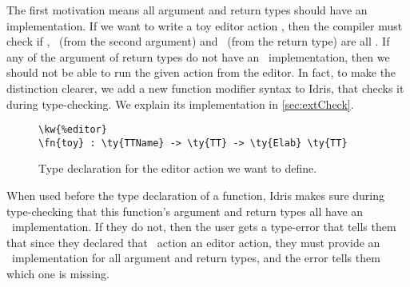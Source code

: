 The first motivation means all argument and return types should have an
 implementation. If we want to write a toy editor action
,
then the compiler must check if , \TT\ (from the second argument)
and \TT\ (from the return type) are all \Editorable. If any of the argument of
return types do not have an \Editorable\ implementation, then we should not be
able to run the given action from the editor. In fact, to make the distinction
clearer, we add a new function modifier syntax  to Idris, that
checks it during type-checking.  We explain its implementation in
\autoref{sec:extCheck}.

\begin{figure}[H]
\caption{Type declaration for the  editor action we want to define.}
\begin{Verbatim}[framesep=2mm, label=\footnotesize{\normalfont{Idris}}, labelposition=topline]
\kw{%editor}
\fn{toy} : \ty{TTName} -> \ty{TT} -> \ty{Elab} \ty{TT}
\end{Verbatim}
\end{figure}

When used before the type declaration of a function, Idris makes sure during
type-checking that this function's argument and return types all have an
\Editorable\ implementation. If they do not, then the user gets a type-error
that tells them that since they declared that \Elab\ action an editor action,
they must provide an \Editorable\ implementation for all argument and return
types, and the error tells them which one is missing.

